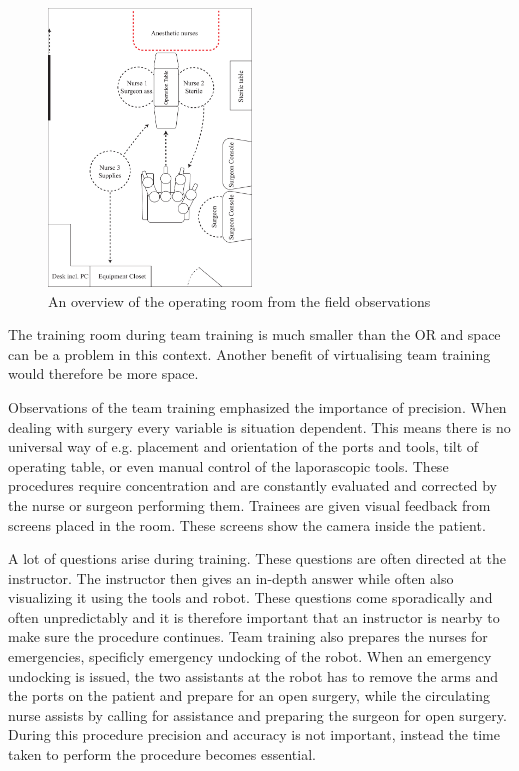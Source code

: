 \documentclass[conference]{IEEEtran}
\begin{document}
\begin{figure}
 \centering
 \includegraphics[width=0.48\textwidth]{Figures/overview.pdf}
 \caption{An overview of the operating room from the field observations}
 \label{fig:overview}
 \end{figure}
 
The training room during team training is much smaller than the OR and space can be a problem in this context. Another benefit of virtualising team training would therefore be more space.

Observations of the team training emphasized the importance of precision. When dealing with surgery every variable is situation dependent. This means there is no universal way of e.g. placement and orientation of the ports and tools, tilt of operating table, or even manual control of the laporascopic tools. These procedures require concentration and are constantly evaluated and corrected by the nurse or surgeon performing them. Trainees are given visual feedback from screens placed in the room. These screens show the camera inside the patient. 


A lot of questions arise during training. These questions are often directed at the instructor. The instructor then gives an in-depth answer while often also visualizing it using the tools and robot. These questions come sporadically and often unpredictably and it is therefore important that an instructor is nearby to make sure the procedure continues. Team training also prepares the nurses for emergencies, specificly emergency undocking of the robot. When an emergency undocking is issued, the two assistants at the robot has to remove the arms and the ports on the patient and prepare for an open surgery, while the circulating nurse assists by calling for assistance and preparing the surgeon for open surgery. During this procedure precision and accuracy is not important, instead the time taken to perform the procedure becomes essential. 
\end{document}
